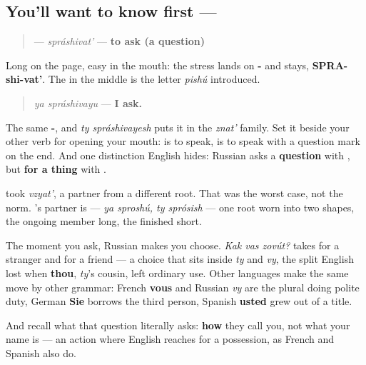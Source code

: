 \subsection*{You'll want to know first — }
\begin{quote}
\textbf{} — \emph{spráshivat'} — \textbf{to ask (a question)}
\end{quote}

Long on the page, easy in the mouth: the stress lands on \textbf{-} and stays, \textbf{SPRA-shi-vat'}. The \textbf{} in the middle is the letter \emph{pishú} introduced.

\begin{quote}
\emph{ya spráshivayu} — \textbf{I ask.}
\end{quote}

The same \textbf{-}, and \emph{ty spráshivayesh} puts it in the \emph{znat'} family. Set it beside your other verb for opening your mouth: \textbf{} is to speak, \textbf{} is to speak with a question mark on the end. And one distinction English hides: Russian asks a \textbf{question} with \emph{}, but \textbf{for a thing} with \emph{}.

\begin{grammarlens}[title={Grammar Lens: an ordinary pair, after a very strange one}]
\emph{} took \emph{vzyat'}, a partner from a different root. That was the worst case, not the norm. \textbf{}'s partner is \textbf{} — \emph{ya sproshú, ty sprósish} — one root worn into two shapes, the ongoing member long, the finished short.
\end{grammarlens}

\begin{culture}
The moment you ask, Russian makes you choose. \emph{Kak vas zovút?} takes \textbf{} for a stranger and \textbf{} for a friend — a choice that sits inside \emph{ty} and \emph{vy}, the split English lost when \textbf{thou}, \emph{ty}'s cousin, left ordinary use. Other languages make the same move by other grammar: French \textbf{vous} and Russian \emph{vy} are the plural doing polite duty, German \textbf{Sie} borrows the third person, Spanish \textbf{usted} grew out of a title.

And recall what that question literally asks: \textbf{how} they call you, not what your name is — an action where English reaches for a possession, as French and Spanish also do.
\end{culture}

